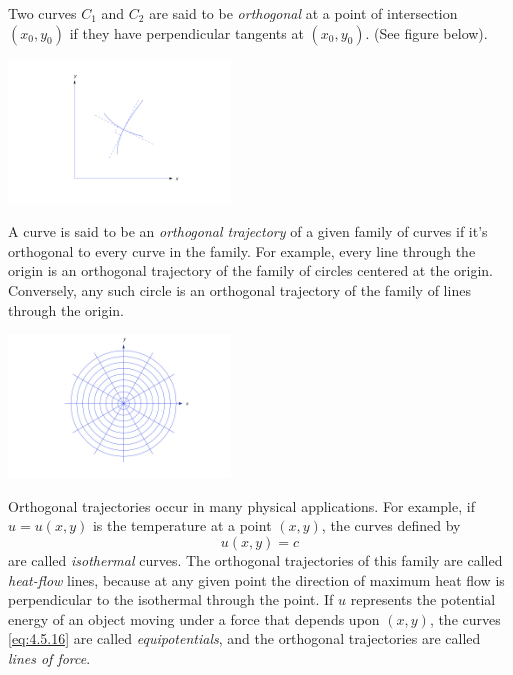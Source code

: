 \documentclass{ximera}
\begin{document}
Two curves $C_1$ and $C_2$ are said to be \textit{orthogonal} at a
point of intersection $(x_0,y_0)$ if they have perpendicular tangents
at $(x_0,y_0)$. (See figure below). 

\begin{image}
  \includegraphics[height=1.5in]{fig040510.jpg} 
\end{image}


A curve is said to be an
\textit{orthogonal trajectory} of a given family of curves if it's
orthogonal to every curve in the family. For example, every line
through the origin is an orthogonal trajectory of the family of
circles centered at the origin.  Conversely,
any such circle is an orthogonal trajectory of the family of lines
through the origin.

\begin{image}
  \includegraphics[height=1.5in]{fig040511.jpg} 
\end{image}

Orthogonal trajectories occur in many physical applications.
For example, if $u=u(x,y)$ is the temperature at a point $(x,y)$,  the
curves defined by
\begin{equation} \label{eq:4.5.16}
u(x,y)=c
\end{equation}
are called \textit{isothermal} curves. The orthogonal trajectories of
this family are called \textit{heat-flow} lines, because at any given
point the direction of maximum heat flow is perpendicular to the
isothermal through the point. If $u$ represents the potential energy
of an object moving under a force that depends upon $(x,y)$,  the
curves \eqref{eq:4.5.16} are called \textit{equipotentials}, and the
orthogonal trajectories are called \textit{lines of force}.
\end{document}

